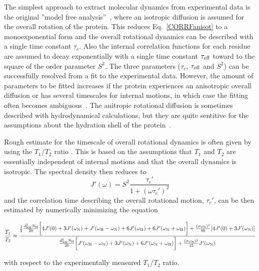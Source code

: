 \documentclass[pre,aps,floatfix,authordate1-4,twocolumn]{revtex4-1}
\begin{document}
The simplest approach to extract molecular dynamics from experimental
data is the original ''model free analysis''~\cite{Lipari82},
where an isotropic diffusion is assumed for the overall rotation of the protein.
This reduces Eq.~\ref{CORRFanisot} to a monoexponential form and the overall rotational
dynamics can be described with a single time constant $\tau_c$.
Also the internal correlation functions for each residue are assumed
to decay exponentially with a single time constant $\tau_{\rm eff}$
toward to the square of the order parameter $S^2$. The three parameters
($\tau_c$, $\tau_{\rm eff}$ and $S^2$) can be successfully resolved from a
fit to the experimental data.
However, the amount of parameters to be fitted increases if the protein
experiences an anisotropic overall diffusion or has several timescales for internal motions,
in which case the fitting often becomes ambiguous~\cite{dosset00,luginbuhl97,jarymowycz06}.
The anitropic rotational diffusion is sometimes described with hydrodynamical
calculations, but they are quite sentitive for the assumptions about the
hydration shell of the protein~\cite{torre00}.

Rough estimate for the timescale of overall rotational dynamics 
is often given by using the $T_1/T_2$ ratio \cite{kay89}. 
This is based on the assumptions that $T_1$ and $T_2$
are essentially independent of internal motions and that the overall
dynamics is isotropic. The spectral density then reduces to 
\begin{equation}
J'(\omega) = S^2\frac{\tau_c'}{1+(\omega \tau_c')^2} 
\end{equation}
and the correlation time describing the overall rotational motion, $\tau_c'$, can 
be then estimated by numerically minimizing the equation
\begin{widetext}
\begin{equation}\label{ratioEQ}
  \frac{T_1}{T_2} \approx  \frac{\frac{1}{2}\frac{d_{\rm{NH}}^2N_{\rm{H}}}{20}\bigg[4J'(0)+3J'(\omega_{\rm{N}})+J'(\omega_{\rm{H}}-\omega_{\rm{N}})+6J'(\omega_{\rm{H}})  +6J'(\omega_{\rm{N}}+\omega_{\rm{H}})\bigg]+\frac{(\sigma \omega_{\rm{N}})^2}{90}[4J'(0) +3J'(\omega_{\rm{N}})]}{\frac{d_{\rm{NH}}^2N_{\rm{H}}}{20}\bigg[J'(\omega_{\rm{H}}-\omega_{\rm{N}})+3J'(\omega_{\rm{N}})+6J'(\omega_{\rm{N}}+\omega_{\rm{H}})\bigg] +\frac{(\sigma \omega_{\rm{N}})^2}{15}J'(\omega_{\rm{N}})}
\end{equation}
\end{widetext}
with respect to the experimentally measured $T_1/T_2$ ratio.
\end{document}
